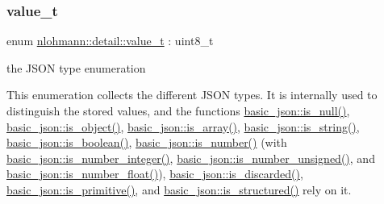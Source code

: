 \subsubsection{\texorpdfstring{value\_t}{value\_t}}
{\footnotesize\ttfamily enum \mbox{\hyperlink{namespacenlohmann_1_1detail_a90aa5ef615aa8305e9ea20d8a947980f}{nlohmann\+::detail\+::value\+\_\+t}} \+: uint8\+\_\+t\hspace{0.3cm}{\ttfamily [strong]}}



the J\+S\+ON type enumeration 

This enumeration collects the different J\+S\+ON types. It is internally used to distinguish the stored values, and the functions \mbox{\hyperlink{classnlohmann_1_1basic__json_a8faa039ca82427ed29c486ffd00600c3}{basic\+\_\+json\+::is\+\_\+null()}}, \mbox{\hyperlink{classnlohmann_1_1basic__json_af8f511af124e82e4579f444b4175787c}{basic\+\_\+json\+::is\+\_\+object()}}, \mbox{\hyperlink{classnlohmann_1_1basic__json_aef9ce5dd2381caee1f8ddcdb5bdd9c65}{basic\+\_\+json\+::is\+\_\+array()}}, \mbox{\hyperlink{classnlohmann_1_1basic__json_a69b596a4a6683b362095c9a139637396}{basic\+\_\+json\+::is\+\_\+string()}}, \mbox{\hyperlink{classnlohmann_1_1basic__json_a943e8cb182d0f2365c76d64b42eaa6fd}{basic\+\_\+json\+::is\+\_\+boolean()}}, \mbox{\hyperlink{classnlohmann_1_1basic__json_a2b9852390abb4b1ef5fac6984e2fc0f3}{basic\+\_\+json\+::is\+\_\+number()}} (with \mbox{\hyperlink{classnlohmann_1_1basic__json_abac8af76067f1e8fdca9052882c74428}{basic\+\_\+json\+::is\+\_\+number\+\_\+integer()}}, \mbox{\hyperlink{classnlohmann_1_1basic__json_abc7378cba0613a78b9aad1c8e7044bb0}{basic\+\_\+json\+::is\+\_\+number\+\_\+unsigned()}}, and \mbox{\hyperlink{classnlohmann_1_1basic__json_a33b4bf898b857c962e798fc7f6e86e70}{basic\+\_\+json\+::is\+\_\+number\+\_\+float()}}), \mbox{\hyperlink{classnlohmann_1_1basic__json_aabe623bc8304c2ba92d96d91f390fab4}{basic\+\_\+json\+::is\+\_\+discarded()}}, \mbox{\hyperlink{classnlohmann_1_1basic__json_a6362b88718eb5c6d4fed6a61eed44b95}{basic\+\_\+json\+::is\+\_\+primitive()}}, and \mbox{\hyperlink{classnlohmann_1_1basic__json_a9f68a0af820c3ced7f9d17851ce4c22d}{basic\+\_\+json\+::is\+\_\+structured()}} rely on it.

